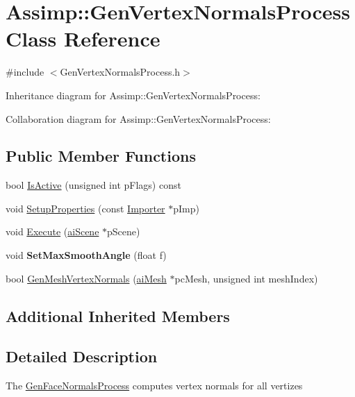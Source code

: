 \hypertarget{class_assimp_1_1_gen_vertex_normals_process}{\section{Assimp\+:\+:Gen\+Vertex\+Normals\+Process Class Reference}
\label{class_assimp_1_1_gen_vertex_normals_process}
}


{\ttfamily \#include $<$Gen\+Vertex\+Normals\+Process.\+h$>$}



Inheritance diagram for Assimp\+:\+:Gen\+Vertex\+Normals\+Process\+:


Collaboration diagram for Assimp\+:\+:Gen\+Vertex\+Normals\+Process\+:
\subsection*{Public Member Functions}
\begin{DoxyCompactItemize}
\item 
bool \hyperlink{class_assimp_1_1_gen_vertex_normals_process_adfc1ca109cebeeb56649b6ec1787d971}{Is\+Active} (unsigned int p\+Flags) const 
\item 
void \hyperlink{class_assimp_1_1_gen_vertex_normals_process_af090526a8a1e0b9d84fd16cd6059b563}{Setup\+Properties} (const \hyperlink{class_assimp_1_1_importer}{Importer} $\ast$p\+Imp)
\item 
void \hyperlink{class_assimp_1_1_gen_vertex_normals_process_a2514a574f19838ebb9aa7c539d16ebe2}{Execute} (\hyperlink{structai_scene}{ai\+Scene} $\ast$p\+Scene)
\item 
\hypertarget{class_assimp_1_1_gen_vertex_normals_process_a3af4e9569c242840570315562b84c7da}{void {\bfseries Set\+Max\+Smooth\+Angle} (float f)}\label{class_assimp_1_1_gen_vertex_normals_process_a3af4e9569c242840570315562b84c7da}

\item 
bool \hyperlink{class_assimp_1_1_gen_vertex_normals_process_ac591d330ec07c819c42130634d389c83}{Gen\+Mesh\+Vertex\+Normals} (\hyperlink{structai_mesh}{ai\+Mesh} $\ast$pc\+Mesh, unsigned int mesh\+Index)
\end{DoxyCompactItemize}
\subsection*{Additional Inherited Members}


\subsection{Detailed Description}
The \hyperlink{class_assimp_1_1_gen_face_normals_process}{Gen\+Face\+Normals\+Process} computes vertex normals for all vertizes 

